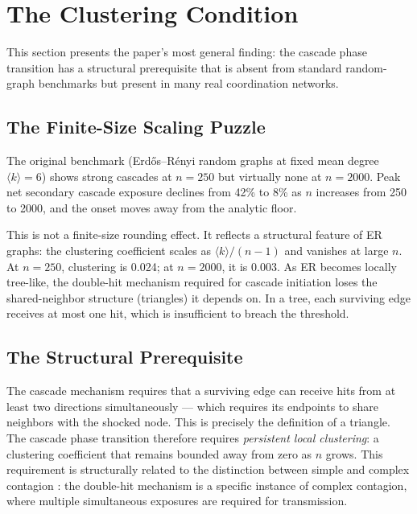 \documentclass[11pt,a4paper]{article}
\begin{document}
\section{The Clustering Condition}

This section presents the paper's most general finding: the cascade phase transition has a structural prerequisite that is absent from standard random-graph benchmarks but present in many real coordination networks.

\subsection{The Finite-Size Scaling Puzzle}

The original benchmark (Erd\H{o}s--R\'enyi random graphs at fixed mean degree $\langle k \rangle = 6$) shows strong cascades at $n = 250$ but virtually none at $n = 2000$. Peak net secondary cascade exposure declines from 42\% to 8\% as $n$ increases from 250 to 2000, and the onset moves away from the analytic floor.

This is not a finite-size rounding effect. It reflects a structural feature of ER graphs: the clustering coefficient scales as $\langle k \rangle / (n-1)$ and vanishes at large $n$. At $n = 250$, clustering is 0.024; at $n = 2000$, it is 0.003. As ER becomes locally tree-like, the double-hit mechanism required for cascade initiation loses the shared-neighbor structure (triangles) it depends on. In a tree, each surviving edge receives at most one hit, which is insufficient to breach the threshold.

\subsection{The Structural Prerequisite}

The cascade mechanism requires that a surviving edge can receive hits from at least two directions simultaneously --- which requires its endpoints to share neighbors with the shocked node. This is precisely the definition of a triangle. The cascade phase transition therefore requires \emph{persistent local clustering}: a clustering coefficient that remains bounded away from zero as $n$ grows. This requirement is structurally related to the distinction between simple and complex contagion \cite{centola2007}: the double-hit mechanism is a specific instance of complex contagion, where multiple simultaneous exposures are required for transmission.
\end{document}
